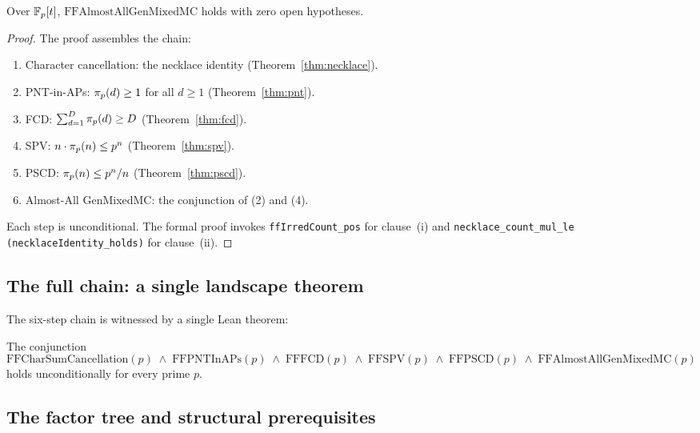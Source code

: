 \begin{theorem}\label{thm:almost-all}
Over $\mathbb{F}_p[t]$, $\mathrm{FFAlmostAllGenMixedMC}$ holds with zero open
hypotheses.
\end{theorem}

\begin{proof}
The proof assembles the chain:
\begin{enumerate}
  \item Character cancellation: the necklace identity
    (Theorem~\ref{thm:necklace}).
  \item PNT-in-APs: $\pi_p(d) \geq 1$ for all $d \geq 1$
    (Theorem~\ref{thm:pnt}).
  \item FCD: $\sum_{d=1}^{D} \pi_p(d) \geq D$
    (Theorem~\ref{thm:fcd}).
  \item SPV: $n \cdot \pi_p(n) \leq p^n$
    (Theorem~\ref{thm:spv}).
  \item PSCD: $\pi_p(n) \leq p^n/n$
    (Theorem~\ref{thm:pscd}).
  \item Almost-All GenMixedMC: the conjunction of (2) and (4).
\end{enumerate}
Each step is unconditional. The formal proof invokes
\texttt{ffIrredCount\_pos} for clause~(i) and
\texttt{necklace\_count\_mul\_le (necklaceIdentity\_holds)} for clause~(ii).
\end{proof}

\subsection{The full chain: a single landscape theorem}

The six-step chain is witnessed by a single Lean theorem:

\begin{theorem}\label{thm:full-chain}
The conjunction
\[
  \mathrm{FFCharSumCancellation}(p) \;\wedge\;
  \mathrm{FFPNTInAPs}(p) \;\wedge\;
  \mathrm{FFFCD}(p) \;\wedge\;
  \mathrm{FFSPV}(p) \;\wedge\;
  \mathrm{FFPSCD}(p) \;\wedge\;
  \mathrm{FFAlmostAllGenMixedMC}(p)
\]
holds unconditionally for every prime $p$.
\end{theorem}

\subsection{The factor tree and structural prerequisites}

